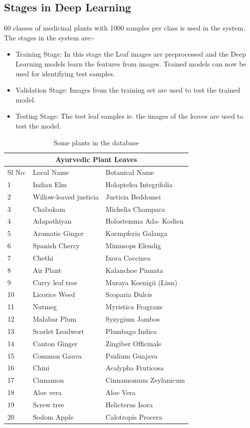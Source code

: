 \subsection{Stages in Deep Learning }
60 classes of medicinal plants with 1000 samples per class is used in the system.
The stages in the system are:- \\
\begin{itemize}
    \item {Training Stage:}
       In this stage the Leaf images are preprocessed and the Deep Learning models learn the features from images. 
       Trained models can now be used for identifying test samples.
    \item {Validation Stage:}
       Images from the training set are used to test the trained model.
    \item{Testing Stage:}
       The test leaf samples ie. the images of the leaves are used to test the model. 
\end{itemize}
\begin{table}
\begin{center}
\begin{tabular}{ |p{1.5cm}|p{5cm}|p{5cm}| }
 \hline
 \multicolumn{3}{|c|}{Ayurvedic Plant Leaves} \\
 \hline
 Sl No: &Local Name &Botanical Name\\
 \hline
 1   & Indian Elm    &Holoptelea Integrifolia\\
 2   & Willow-leaved justicia    &Justicia Beddomei\\
 3   & Chabakam    &Michelia Champaca\\
 4   & Adapathiyan    &Holostemma Ada- Kodien\\
 5   &Aromatic Ginger  &Kaempferia Galanga\\
 6   & Spanish Cherry   &Mimusops Elendig\\
 7   & Chethi  &Ixora Coccinea\\
 8   & Air Plant  &Kalanchoe Pinnata\\
 9   & Curry leaf tree   &Muraya Koenigii (Linn)\\
 10  & Licorice Weed   &Scoparia Dulcis\\
 11  & Nutmeg    &Myristica Fragrans\\
 12  & Malabar Plum   &Syzygium Jambos\\
 13  & Scarlet Leadwort  &Plumbago Indica\\
 14  & Canton Ginger  &Zingiber Officinale\\
 15  & Common Gauva &Psidium Guajava\\
 16  & Chini    &Acalypha Fruticosa\\
 17  & Cinnamon    &Cinnamomum Zeylanicum\\
 18  & Aloe vera   &Aloe Vera\\
 19  & Screw tree    &Helicterus Isora\\
 20  & Sodom Apple    &Calotropis Procera\\

 \hline
\end{tabular}
\end{center}
\caption{Some plants in the database}
\end{table}


